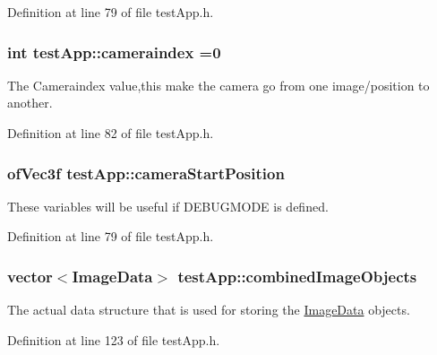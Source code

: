 Definition at line 79 of file test\-App.\-h.

\hypertarget{classtest_app_a4ca3a51642dedbf37f2b9f6ef96510c7}{
\subsubsection[{cameraindex}]{\setlength{\rightskip}{0pt plus 5cm}int test\-App\-::cameraindex =0}}\label{classtest_app_a4ca3a51642dedbf37f2b9f6ef96510c7}


The Cameraindex value,this make the camera go from one image/position to another. 



Definition at line 82 of file test\-App.\-h.

\hypertarget{classtest_app_ac01013264b9988207e7fd9e0a486ff2f}{
\subsubsection[{camera\-Start\-Position}]{\setlength{\rightskip}{0pt plus 5cm}of\-Vec3f test\-App\-::camera\-Start\-Position}}\label{classtest_app_ac01013264b9988207e7fd9e0a486ff2f}


These variables will be useful if D\-E\-B\-U\-G\-M\-O\-D\-E is defined. 



Definition at line 79 of file test\-App.\-h.

\hypertarget{classtest_app_aced9b8a8419c8465877c2c9cd43f8934}{
\subsubsection[{combined\-Image\-Objects}]{\setlength{\rightskip}{0pt plus 5cm}vector$<${\bf Image\-Data}$>$ test\-App\-::combined\-Image\-Objects}}\label{classtest_app_aced9b8a8419c8465877c2c9cd43f8934}


The actual data structure that is used for storing the \hyperlink{struct_image_data}{Image\-Data} objects. 



Definition at line 123 of file test\-App.\-h.


